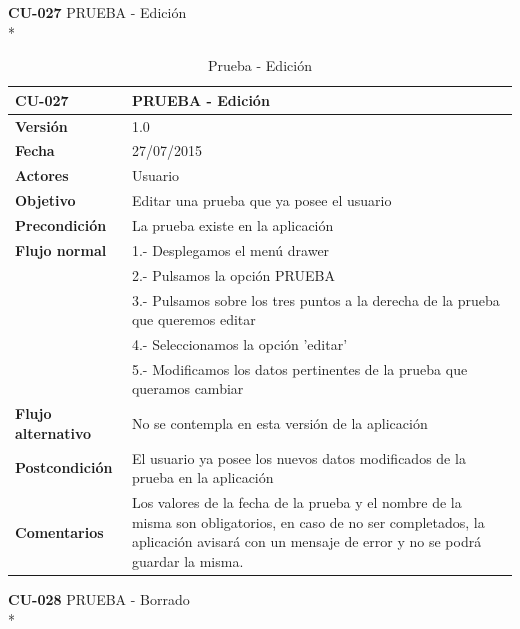 \documentclass[../pfc.tex]{subfiles}
\begin{document}
	\clearpage
	
	\textbf{CU-027}	PRUEBA - Edición\\*
	
	\begin{table}[H]
		\centering
		\begin{tabular}[t]{|p{3cm}|p{9.5cm}|}
			\hline \textbf{CU-027} & \textbf{PRUEBA - Edición} \\*
			\hline\hline \textbf{Versión} & 1.0 \\*
			\hline\hline \textbf{Fecha} & 27/07/2015 \\*
			\hline\textbf{Actores} 	& Usuario\\*
			\hline \textbf{Objetivo} & Editar una prueba que ya posee el usuario\\* 			
			\hline \textbf{Precondición} & La prueba existe en la aplicación\\* 
			\hline \textbf{Flujo normal} & 1.- Desplegamos el menú drawer \\* 
			& 2.- Pulsamos la opción PRUEBA\\*	
			& 3.- Pulsamos sobre los tres puntos a la derecha de la prueba que queremos editar\\*	
			& 4.- Seleccionamos la opción 'editar'\\*	
			& 5.- Modificamos los datos pertinentes de la prueba que queramos cambiar\\*	
			\hline \textbf{Flujo alternativo} & No se contempla en esta versión de la aplicación \\* 
			\hline \textbf{Postcondición} & El usuario ya posee los nuevos datos modificados de la prueba en la aplicación \\* 
			\hline \textbf{Comentarios}   & Los valores de la fecha de la prueba y el nombre de la misma son obligatorios, en caso de no ser completados, la aplicación avisará con un mensaje de error y no se podrá guardar la misma.\\*
			\hline
		\end{tabular}
		\caption{Prueba - Edición}
		\label{tabla:caso027}
	\end{table}
	
	\clearpage
	
	\textbf{CU-028}	PRUEBA - Borrado\\*
	
\end{document}
